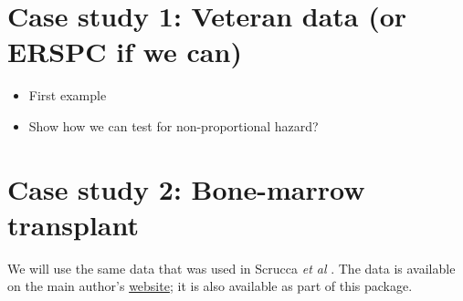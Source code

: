 \documentclass[article]{jss}
\providecommand{\tightlist}{%
  \setlength{\itemsep}{0pt}\setlength{\parskip}{0pt}}
\begin{document}
\section{Case study 1: Veteran data (or ERSPC if we
can)}\label{case-study-1-veteran-data-or-erspc-if-we-can}

\begin{itemize}
\tightlist
\item
  First example
\item
  Show how we can test for non-proportional hazard?
\end{itemize}

\section{Case study 2: Bone-marrow
transplant}\label{case-study-2-bone-marrow-transplant}

We will use the same data that was used in Scrucca \emph{et al}
\citep{scrucca2010regression}. The data is available on the main
author's \href{http://www.stat.unipg.it/luca/R/}{website}; it is also
available as part of this package.
\end{document}
